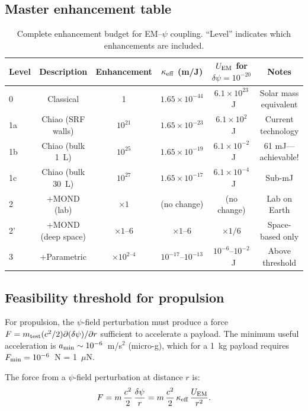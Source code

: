 \documentclass[12pt,aps,prd,twocolumn,superscriptaddress,nofootinbib]{revtex4-2}
\newcommand{\ee}[1]{\times 10^{#1}}
\begin{document}
\subsection{Master enhancement table}

\begin{table}[t]
\caption{Complete enhancement budget for EM--$\psi$ coupling.
``Level'' indicates which enhancements are included.}
\label{tab:enhancement-budget}
\begin{ruledtabular}
\begin{tabular}{lccccc}
Level & Description & Enhancement & $\kappa_{\rm eff}$ (m/J)
& $U_{\rm EM}$ for $\delta\psi = 10^{-20}$ & Notes \\
\hline
0 & Classical & 1 & $1.65\ee{-44}$ & $6.1\ee{23}$~J & Solar mass equivalent \\
1a & Chiao (SRF walls) & $10^{21}$ & $1.65\ee{-23}$ & $6.1\ee{2}$~J
& Current technology \\
1b & Chiao (bulk 1~L) & $10^{25}$ & $1.65\ee{-19}$ & $6.1\ee{-2}$~J
& 61 mJ---achievable! \\
1c & Chiao (bulk 30~L) & $10^{27}$ & $1.65\ee{-17}$ & $6.1\ee{-4}$~J
& Sub-mJ \\
2 & +MOND (lab) & $\times 1$ & (no change) & (no change)
& Lab on Earth \\
2' & +MOND (deep space) & $\times 1$--$6$ & $\times 1$--$6$ & $\times 1/6$
& Space-based only \\
3 & +Parametric & $\times 10^{2\text{--}4}$ & $10^{-17}$--$10^{-13}$
& $10^{-6}$--$10^{-2}$~J & Above threshold \\
\end{tabular}
\end{ruledtabular}
\end{table}

\subsection{Feasibility threshold for propulsion}

For propulsion, the $\psi$-field perturbation must produce a force
$F = m_{\rm test}(c^2/2)\partial(\delta\psi)/\partial r$ sufficient
to accelerate a payload. The minimum useful acceleration is
$a_{\rm min} \sim 10^{-6}$~m/s$^2$ (micro-g), which for a 1~kg
payload requires $F_{\rm min} = 10^{-6}$~N = 1~$\mu$N.

The force from a $\psi$-field perturbation at distance $r$ is:
\begin{equation}
F = m\,\frac{c^2}{2}\,\frac{\delta\psi}{r}
= m\,\frac{c^2}{2}\,\kappa_{\rm eff}\,\frac{U_{\rm EM}}{r^2}.
\end{equation}
\end{document}
